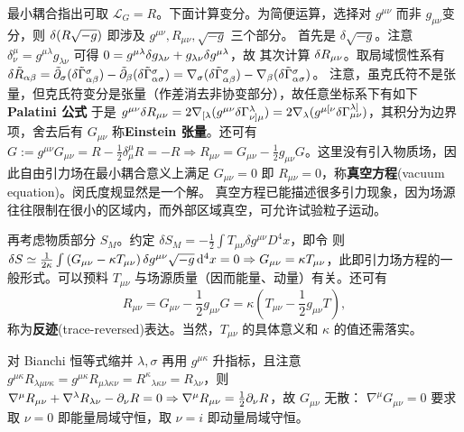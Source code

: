 最小耦合指出可取 $\mathcal L_G=R$。下面计算变分。为简便运算，选择对 $g^{\mu\nu}$ 而非 $g_{\mu\nu}$变分，则 $\var(R\sqrt{-g})$ 即涉及 $g^{\mu\nu},R_{\mu\nu},\sqrt{-g}$ 三个部分。
首先是 $\delta\sqrt{-g}$。注意 $\delta^{\mu}_{\nu}=g^{\mu\lambda}g_{\lambda\nu}$ 可得 $0=g^{\mu\lambda}\var g_{\lambda\nu}+g_{\lambda\nu}\var g^{\mu\lambda}$，故
其次计算 $\var R_{\mu\nu}$。取局域惯性系有 $\delta\tilde R_{\alpha\beta} = \tilde{\partial}_\sigma(\delta\tilde\Gamma^\sigma_{\alpha\beta})-\tilde{\partial}_\beta(\delta\tilde \Gamma^\sigma_{\alpha\sigma}) = \nabla_\sigma(\delta\tilde\Gamma^\sigma_{\alpha\beta})-\nabla_\beta(\delta\tilde \Gamma^\sigma_{\alpha\sigma})$。
注意，虽克氏符不是张量，但克氏符变分是张量（作差消去非协变部分），故任意坐标系下有如下\textbf{Palatini 公式}
于是 $g^{\mu\nu}\var R_{\mu\nu}=2 \nabla_{[\lambda}( g^{\mu\nu} \delta \Gamma_{\nu]\mu}^\lambda) =2\nabla_\lambda(g^{\mu [\nu} \delta \Gamma_{\mu \nu}^{\lambda]})$，其积分为边界项，舍去后有
$G_{\mu\nu}$ 称\textbf{Einstein 张量}。还可有 $G:=g^{\mu\nu}G_{\mu\nu}=R-\frac{1}{2}\delta^\mu_\mu R=-R\Rightarrow R_{\mu\nu}=G_{\mu\nu}-\frac 12 g_{\mu\nu} G$。这里没有引入物质场，因此自由引力场在最小耦合意义上满足 $G_{\mu\nu}=0$ 即 $R_{\mu\nu}=0$，称\textbf{真空方程}(vacuum equation)。闵氏度规显然是一个解。
真空方程已能描述很多引力现象，因为场源往往限制在很小的区域内，而外部区域真空，可允许试验粒子运动。

再考虑物质部分 $S_M$。约定 $\delta S_M =-\frac{1}{2} \int T_{\mu \nu} \delta g^{\mu \nu} D^4{x}$，即令
则 $\var S\simeq\frac{1}{2\kappa}\int\left(G_{\mu\nu}-\kappa T_{\mu\nu}\right)\var g^{\mu\nu}\sqrt{-g}\dd[4]{x}=0\Rightarrow G_{\mu\nu}=\kappa T_{\mu\nu}$，此即引力场方程的一般形式。可以预料 $T_{\mu\nu}$ 与场源质量（因而能量、动量）有关。还可有
\[ 
R_{\mu\nu}=G_{\mu\nu}-\frac 12 g_{\mu\nu} G=\kappa\left(T_{\mu\nu}-\frac12 g_{\mu\nu}T\right),
\]
称为\textbf{反迹}(trace-reversed)表达。当然，$T_{\mu\nu}$ 的具体意义和 $\kappa$ 的值还需落实。

对 Bianchi 恒等式缩并 $\lambda,\sigma$ 再用 $g^{\mu\kappa}$ 升指标，且注意 $g^{\mu\kappa} R_{\lambda \mu\nu\kappa}=g^{\mu\kappa} R_{\mu\lambda\kappa \nu}=R^{\kappa}{}_{\lambda\kappa \nu}=R_{\lambda\nu}$，则 $\nabla^{\mu} R_{\mu\nu}+ \nabla^\lambda R_{\lambda\nu}-\partial_\nu R=0\Rightarrow\nabla^{\mu} R_{\mu\nu}=\frac 12\partial_\nu R$，故 $G_{\mu\nu}$ 无散：
$\nabla^{\mu}G_{\mu\nu}=0$ 要求
取 $\nu=0$ 即能量局域守恒，取 $\nu=i$ 即动量局域守恒。

